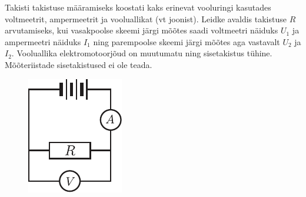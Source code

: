 \documentclass[10pt, twoside]{article}
\begin{document}
{%

Takisti takistuse määramiseks koostati kaks erinevat vooluringi kasutades voltmeetrit, ampermeetrit ja vooluallikat (vt joonist). Leidke avaldis takistuse $R$ arvutamiseks, kui vasakpoolse skeemi järgi mõõtes saadi voltmeetri näiduks $U_1$ ja ampermeetri näiduks $I_1$ ning parempoolse skeemi järgi mõõtes aga vastavalt $U_2$ ja $I_2$. Vooluallika elektromotoorjõud on muutumatu ning sisetakistus tühine. Mõõteriistade sisetakistused ei ole teada.

\begin{figure}[h]
	\centering
	\begin{minipage}[b]{0.25\textwidth}
		\includegraphics[width=\linewidth]{2005-v2g-04-yl1}
	\end{minipage}
	\hspace{30pt}
	\begin{minipage}[b]{0.3\textwidth}

\end{minipage}
\end{figure}}
\end{document}
